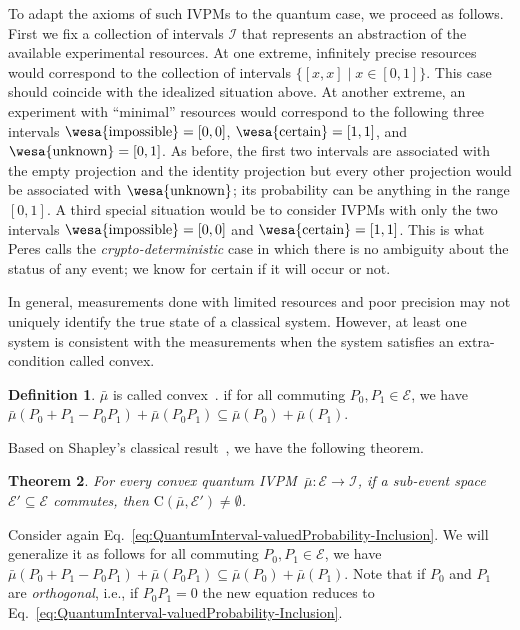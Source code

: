 \documentclass[english,reprint, aps, prl,superscriptaddress, showpacs,
showkeys, longbibliography, amsmath, amssymb]{revtex4-1}
\theoremstyle{plain}
\newtheorem{thm}{Theorem}
\theoremstyle{definition}
\newtheorem{definition}[thm]{Definition}
\newcommand{\events}{\ensuremath{\mathcal{E}}}
\newcommand{\imposs}{{\text{\wesa{impossible}}}}
\newcommand{\necess}{{\text{\wesa{certain}}}}
\newcommand{\unknown}{{\text{\wesa{unknown}}}}
\newcommand{\coreBorn}{\ensuremath{\mathrm{C}}}
\begin{document}
 To adapt the axioms of such IVPMs to the quantum case, we proceed as
follows. First we fix a collection of intervals $\mathscr{I}$ that
represents an abstraction of the available experimental resources. At
one extreme, infinitely precise resources would correspond to the
collection of intervals $\{[x,x] \mid x \in [0,1]\}$. This case should
coincide with the idealized situation above. At another extreme, an
experiment with ``minimal'' resources would correspond to the
following three intervals $\imposs=\left[0,0\right]$,
$\necess=\left[1,1\right]$, and $\unknown=[0,1]$. As before, the first
two intervals are associated with the empty projection and the
identity projection but every other projection would be associated
with $\unknown$; its probability can be anything in the range
$[0,1]$. A third special situation would be to consider IVPMs with
only the two intervals $\imposs=\left[0,0\right]$ and
$\necess=\left[1,1\right]$. This is what Peres calls the
\emph{crypto-deterministic} case in which there is no ambiguity about
the status of any event; we know for certain if it will occur or not.

 In general, measurements done with limited resources and poor precision
may not uniquely identify the true state of a classical system. However,
at least one system is consistent with the measurements when the system
satisfies an extra-condition called convex.

\begin{definition}
$\bar{\mu}$ is called convex~\cite{Griffiths2003}. if for all
commuting $P_{0},P_{1}\in\events$, we have
$\bar{\mu}\left(P_{0}+P_{1}-P_{0}P_{1}\right)+\bar{\mu}\left(P_{0}P_{1}\right)\subseteq\bar{\mu}\left(P_{0}\right)+\bar{\mu}\left(P_{1}\right)$.
\end{definition}

Based on Shapley's classical result~\cite{Shapley1971,GilboaSchmeidler1994,Grabisch2016},
we have the following theorem.

\begin{thm}\label{thm:Shapley}For every convex quantum IVPM~$\bar{\mu}:\events\rightarrow\mathscr{I}$,
if a sub-event space~$\events'\subseteq\events$ commutes, then $\coreBorn\left(\bar{\mu},\events'\right)\ne\emptyset$.\end{thm}

Consider again
Eq.~\ref{eq:QuantumInterval-valuedProbability-Inclusion}. We will
generalize it as follows for all commuting $P_{0},P_{1}\in\events$, we
have
$\bar{\mu}\left(P_{0}+P_{1}-P_{0}P_{1}\right)+\bar{\mu}\left(P_{0}P_{1}\right)\subseteq\bar{\mu}\left(P_{0}\right)+\bar{\mu}\left(P_{1}\right)$. Note
that if $P_0$ and $P_1$ are \emph{orthogonal}, i.e., if $P_0P_1=0$ the
new equation reduces to
Eq.~\ref{eq:QuantumInterval-valuedProbability-Inclusion}.
\end{document}
